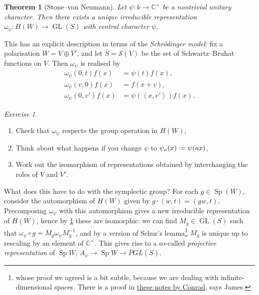 \documentclass[11pt,a4paper,leqno]{article}
\let\mc\mathcal
\newcommand{\1}{\mathbbm{1}}
\newcommand{\C}{\mathbb{C}}
\newcommand*{\defeq}{\mathrel{\vcenter{\baselineskip0.5ex \lineskiplimit0pt
      \hbox{\scriptsize.}\hbox{\scriptsize.}}}%
  =}
\DeclareMathOperator{\Sp}{Sp}
\DeclareMathOperator{\GL}{GL}
\theoremstyle{plain}
\newtheorem{theorem}{Theorem}[section]
\theoremstyle{definition}
\theoremstyle{remark}
\newtheorem*{exercise}{Exercise}
\numberwithin{equation}{section}
\begin{document}
\begin{theorem}[Stone--von Neumann]\label{thm:SvN}
  Let $\psi\colon k \to \C^{\times}$ be a nontrivial unitary character. Then
  there exists a unique irreducible representation $\omega_{\psi} \colon H(W)
  \to \GL(S)$ with central character $\psi$.
\end{theorem}
This has an explicit description in terms of the \emph{Schrödinger
  model}: fix a polarisation $W = V\oplus V'$, and let $S = \mc S(V)$ be
the set of Schwartz--Bruhat functions on $V$. Then $\omega_{\psi}$ is realised
by
\begin{subequations}
  \begin{align}
    \label{eq:15}
    \omega_{\psi}(0,t)f(x) &= \psi(t)f(x),\\ \omega_{\psi}(v,0)f(x) &= f(x+v),\\ \omega_{\psi}(0,v')f(x) &= \psi(\left\langle x,v' \right\rangle )f(x).
  \end{align}
\end{subequations}
\begin{exercise}
  \begin{enumerate}
  
  \item Check that $\omega_{\psi}$ respects the group operation in $H(W)$,
  \item Think about what happens if you change $\psi$ to $\psi_{a}(x)\defeq
    \psi(ax)$,
  \item Work out the isomorphism of representations obtained by
    interchanging the roles of $V$ and $V'$.
  \end{enumerate}
\end{exercise}
What does this have to do with the symplectic group? For each
$g \in \Sp(W)$, consider the automorphism of $H(W)$ given by
$g\cdot (w,t) = (gw,t)$. Precomposing $\omega_{\psi}$ with this automorphism gives
a new irreducible representation of $H(W)$, hence by \cref{thm:SvN}
these are isomorphic: we can find $M_{g} \in \GL(S)$ such that
$\omega_{\psi}\circ g = M_{g}\omega_{\psi}M_{g}^{-1}$, and by a version of Schur's
lemma\footnote{whose proof we agreed is a bit subtle, because we are
  dealing with infinite-dimensional spaces. There is a proof in
  \href{https://virtualmath1.stanford.edu/\%7Econrad/JLseminar/Notes/L2.pdf}{these notes by Conrad}, says James.} $M_{g}$ is unique up to rescaling by an element of
$\C^{\times}$. This gives rise to a so-called \emph{projective
  representation} of $\Sp W$, $A_{\psi} \to \Sp W \to PGL(S)$.
\end{document}
